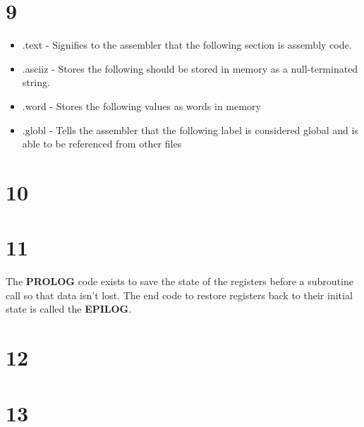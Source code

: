 \documentclass[a4paper,11pt]{article}
\begin{document}

\section*{9}
\begin{itemize}
    \item .text - Signifies to the assembler that the following section is assembly code.
    \item .asciiz - Stores the following should be stored in memory as a null-terminated string.
    \item .word - Stores the following values as words in memory
    \item .globl - Tells the assembler that the following label is considered global and is able to be referenced from other files
\end{itemize}



\section*{10}


\section*{11}
The {\bf PROLOG} code exists to save the state of the registers before a subroutine call so that data isn't lost.  The end code to restore registers back to their initial state is called the {\bf EPILOG}.


\section*{12}


\section*{13}

\end{document}

